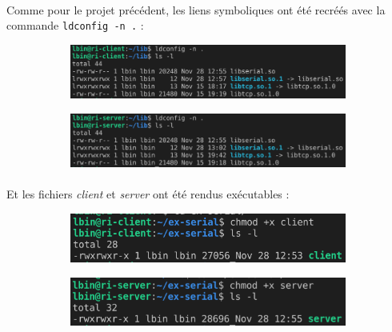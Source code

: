 \documentclass{article}
\begin{document}
    \paragraph{}
    Comme pour le projet précédent, les liens symboliques ont été recréés avec la commande \texttt{ldconfig -n .} :
    \begin{figure}[H]
        \centering
        \begin{subfigure}[b]{.48\textwidth}
            \centering
            \includegraphics[width=\textwidth]{./screenshots/client-liens-symb.png}
        \end{subfigure}
        \begin{subfigure}[b]{.48\textwidth}
            \centering
            \includegraphics[width=\textwidth]{./screenshots/server-liens-symb.png}
        \end{subfigure}
    \end{figure}

    \paragraph{}
    Et les fichiers \emph{client} et \emph{server} ont été rendus exécutables :
    \begin{figure}[H]
        \centering
        \begin{subfigure}[b]{.48\textwidth}
            \centering
            \includegraphics[width=.8\textwidth]{./screenshots/client-exec.png}
        \end{subfigure}
        \begin{subfigure}[b]{.48\textwidth}
            \centering
            \includegraphics[width=.8\textwidth]{./screenshots/server-exec.png}
        \end{subfigure}
    \end{figure}
\end{document}
